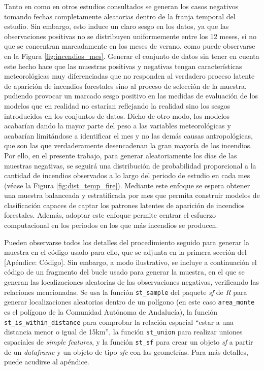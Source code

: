\documentclass[12pt,a4paper,]{book}
\numberwithin{dummy}{section}
\theoremstyle{ocrenumbox}
\theoremstyle{blacknumex}
\theoremstyle{blacknumbox}
\theoremstyle{ocrenum}
\theoremstyle{ocrenum}
\begin{document}
Tanto en \citep{stojanova2012estimating} como en otros estudios
consultados se generan los casos negativos tomando fechas completamente
aleatorias dentro de la franja temporal del estudio. Sin embargo, esto
induce un claro sesgo en los datos, ya que las observaciones positivas
no se distribuyen uniformemente entre los 12 meses, si no que se
concentran marcadamente en los meses de verano, como puede observarse en
la Figura \ref{fig:incendios_mes}. Generar el conjunto de datos sin
tener en cuenta este hecho hace que las muestras positivas y negativas
tengan características meteorológicas muy diferenciadas que no responden
al verdadero proceso latente de aparición de incendios forestales sino
al proceso de selección de la muestra, pudiendo provocar un marcado
sesgo positivo en las medidas de evaluación de los modelos que en
realidad no estarían reflejando la realidad sino los sesgos introducidos
en los conjuntos de datos. Dicho de otro modo, los modelos acabarían
dando la mayor parte del peso a las variables meteorológicas y acabarían
limitándose a identificar el mes y no las demás causas antropológicas,
que son las que verdaderamente desencadenan la gran mayoría de los
incendios. Por ello, en el presente trabajo, para generar aleatoriamente
los días de las muestras negativas, se seguirá una distribución de
probabilidad proporcional a la cantidad de incendios observados a lo
largo del periodo de estudio en cada mes (véase la Figura
\ref{fig:dist_temp_fire}). Mediante este enfoque se espera obtener una
muestra balanceada y estratificada por mes que permita construir modelos
de clasificación capaces de captar los patrones latentes de aparición de
incendios forestales. Además, adoptar este enfoque permite centrar el
esfuerzo computacional en los periodos en los que más incendios se
producen.

Pueden observarse todos los detalles del procedimiento seguido para
generar la muestra en el código usado para ello, que se adjunta en la
primera sección del {[}Apéndice: Código{]}. Sin embargo, a modo
ilustrativo, se incluye a continuación el código de un fragmento del
bucle usado para generar la muestra, en el que se generan las
localizaciones aleatorias de las observaciones negativas, verificando
las relaciones mencionadas. Se usa la función \texttt{st\_sample} del
paquete \emph{sf} de \emph{R} para generar localizaciones aleatorias
dentro de un polígono (en este caso \texttt{area\_monte} es el polígono
de la Comunidad Autónoma de Andalucía), la función
\texttt{st\_is\_within\_distance} para comprobar la relación espacial
``estar a una distancia menor o igual de 15km'', la función
\texttt{st\_union} para realizar uniones espaciales de \emph{simple
features}, y la función \texttt{st\_sf} para crear un objeto \emph{sf} a
partir de un \emph{dataframe} y un objeto de tipo \emph{sfc} con las
geometrías. Para más detalles, puede acudirse al apéndice.
\end{document}
